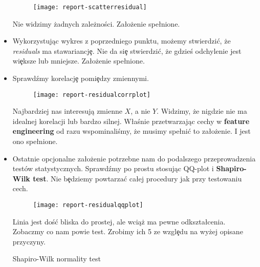 \documentclass{article}
\begin{document}
\begin{itemize}
  \newpage
  
  \begin{figure}[h!]
  \centering
  \texttt{[image: report-scatterresidual]}
  \end{figure}
  
  \noindent
  \quad Nie widzimy żadnych zależności. Za\l ożenie spe\l nione.
  
  \item Wykorzystując wykres z poprzedniego punktu, możemy stwierdzi\'c, że \textit{residuals} ma sta wariancj\c e. Nie da si\c e stwierdzi\'c, że gdzieś odchylenie jest wi\c eksze lub mniejsze. Za\l ożenie spe\l nione.
  
  \item Sprawdźmy korelacj\c e pomi\c edzy zmiennymi.

  \begin{figure}[h!]
  \centering
  \texttt{[image: report-residualcorrplot]}
  \end{figure}
  
  \noindent
  \quad Najbardziej nas interesują zmienne $X$, a nie $Y$. Widzimy, że nigdzie nie ma idealnej korelacji lub bardzo silnej. W\l aśnie przetwarzając cechy w \textbf{feature engineering} od razu wspominaliśmy, że musimy spe\l ni\'c to za\l ożenie. I jest ono spe\l nione.
  
  \item Ostatnie opcjonalne za\l ożenie potrzebne nam do podalszego przeprowadzenia testów statystycznych. Sprawdźmy po prostu stosując QQ-plot i \textbf{Shapiro-Wilk test}. Nie b\c edziemy powtarza\'c ca\l ej procedury jak przy testowaniu cech.
  
  \begin{figure}[h!]
  \centering
  \texttt{[image: report-residualqqplot]}
  \end{figure}
  
  \noindent
  \quad Linia jest doś\'c bliska do prostej, ale wciąż ma pewne odkszta\l cenia. Zobaczmy co nam powie test. Zrobimy ich 5 ze wzgl\c edu na wyżej opisane przyczyny.
  
\begin{Schunk}
\begin{Soutput}
	Shapiro-Wilk normality test


\end{Soutput}
\end{Schunk}
\end{itemize}
\end{document}

